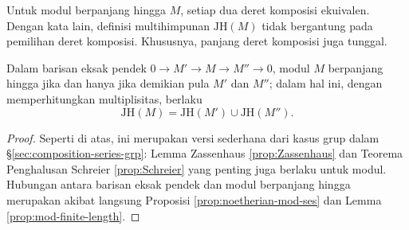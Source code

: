 \begin{theorem}\label{prop:JH-mod}
	Untuk modul berpanjang hingga $M$, setiap dua deret komposisi ekuivalen. Dengan kata lain, definisi multihimpunan $\text{JH}(M)$ tidak bergantung pada pemilihan deret komposisi. Khususnya, panjang deret komposisi juga tunggal.
	
	Dalam barisan eksak pendek $0 \to M' \to M \to M'' \to 0$, modul $M$ berpanjang hingga jika dan hanya jika demikian pula $M'$ dan $M''$; dalam hal ini, dengan memperhitungkan multiplisitas, berlaku
	\[ \text{JH}(M) = \text{JH}(M') \cup \text{JH}(M''). \]
\end{theorem}
\begin{proof}
	Seperti di atas, ini merupakan versi sederhana dari kasus grup dalam \S\ref{sec:composition-series-grp}: Lemma Zassenhaus \ref{prop:Zassenhaus} dan Teorema Penghalusan Schreier \ref{prop:Schreier} yang penting juga berlaku untuk modul. Hubungan antara barisan eksak pendek dan modul berpanjang hingga merupakan akibat langsung Proposisi \ref{prop:noetherian-mod-ses} dan Lemma \ref{prop:mod-finite-length}.
\end{proof}
 
